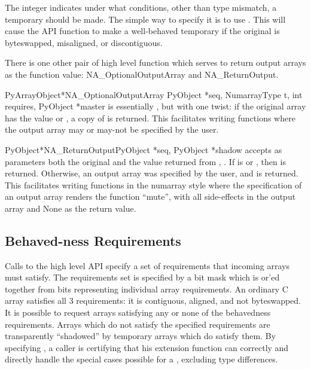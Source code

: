    The  integer indicates under what conditions, other than type
   mismatch, a temporary should be made.  The simple way to specify it is to
   use .  This will cause the API function to make a
   well-behaved temporary if the original is byteswapped, misaligned, or
   discontiguous.  

There is one other pair of high level function which serves to return output
arrays as the function value: NA_OptionalOutputArray and NA_ReturnOutput.

\begin{cfuncdesc}{PyArrayObject*}{NA_OptionalOutputArray}{%
      PyObject *seq, NumarrayType t, int requires, PyObject *master}%
    is essentially
   , but with one twist: if the original array
    has the value  or , a copy of
    is returned.  This facilitates writing functions where the
   output array may or may-not be specified by the \python{} user.  
\end{cfuncdesc}

\begin{cfuncdesc}{PyObject*}{NA_ReturnOutput}{PyObject *seq, PyObject *shadow}
    accepts as parameters both the original
    and the value returned from
   , .  If  is
    or , then  is returned.
   Otherwise, an output array was specified by the user, and 
   is returned.  This facilitates writing functions in the numarray style
   where the specification of an output array renders the function ``mute'',
   with all side-effects in the output array and None as the return value.
\end{cfuncdesc}

\subsection{Behaved-ness Requirements}

Calls to the high level API specify a set of requirements that incoming arrays
must satisfy.  The requirements set is specified by a bit mask which is or'ed
together from bits representing individual array requirements.  An ordinary C
array satisfies all 3 requirements: it is contiguous, aligned, and not
byteswapped.  It is possible to request arrays satisfying any or none of the
behavedness requirements.  Arrays which do not satisfy the specified
requirements are transparently ``shadowed'' by temporary arrays which do
satisfy them.  By specifying , a caller is certifying
that his extension function can correctly and directly handle the special cases
possible for a , excluding type differences.

